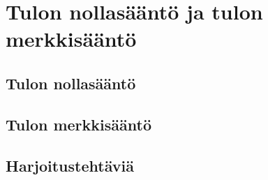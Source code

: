 \chapter{Tulon nollasääntö ja tulon merkkisääntö}

\section{Tulon nollasääntö}

\section{Tulon merkkisääntö}

\section{Harjoitustehtäviä}
